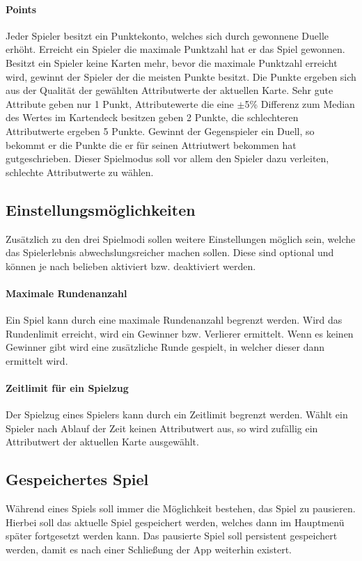 \paragraph{Points}
Jeder Spieler besitzt ein Punktekonto, welches sich durch gewonnene Duelle erhöht. Erreicht ein Spieler die maximale Punktzahl hat er das Spiel gewonnen. Besitzt ein Spieler keine Karten mehr, bevor die maximale Punktzahl erreicht wird, gewinnt der Spieler der die meisten Punkte besitzt. Die Punkte ergeben sich aus der Qualität der gewählten Attributwerte der aktuellen Karte. Sehr gute Attribute geben nur 1 Punkt, Attributewerte die eine $\pm$5\% Differenz zum Median des Wertes im Kartendeck besitzen geben 2 Punkte, die schlechteren Attributwerte ergeben 5 Punkte. Gewinnt der Gegenspieler ein Duell, so bekommt er die Punkte die er für seinen Attriutwert bekommen hat gutgeschrieben. Dieser Spielmodus soll vor allem den Spieler dazu verleiten, schlechte Attributwerte zu wählen.

\subsection{Einstellungsmöglichkeiten}
Zusätzlich zu den drei Spielmodi sollen weitere Einstellungen möglich sein, welche das Spielerlebnis abwechslungsreicher machen sollen. Diese sind optional und können je nach belieben aktiviert bzw. deaktiviert werden.
\paragraph{Maximale Rundenanzahl}
Ein Spiel kann durch eine maximale Rundenanzahl begrenzt werden. Wird das Rundenlimit erreicht, wird ein Gewinner bzw. Verlierer ermittelt. Wenn es keinen Gewinner gibt wird eine zusätzliche Runde gespielt, in welcher dieser dann ermittelt wird.
\paragraph{Zeitlimit für ein Spielzug}
Der Spielzug eines Spielers kann durch ein Zeitlimit begrenzt werden. Wählt ein Spieler nach Ablauf der Zeit keinen Attributwert aus, so wird zufällig ein Attributwert der aktuellen Karte ausgewählt.

\subsection{Gespeichertes Spiel}

Während eines Spiels soll immer die Möglichkeit bestehen, das Spiel zu pausieren. Hierbei soll das aktuelle Spiel gespeichert werden, welches dann im Hauptmenü später fortgesetzt werden kann. Das pausierte Spiel soll persistent gespeichert werden, damit es nach einer Schließung der App weiterhin existert.


